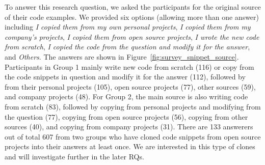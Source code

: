 \documentclass{svjour3}                     %
\begin{document}
To answer this research question, we asked the participants for the original
source of their code examples. We provided six options (allowing more than one
answer) including \textit{I copied them from my own personal projects},
\textit{I copied them from my company's projects}, \textit{I copied them from
	open source projects}, \textit{I wrote the new code from scratch}, \textit{I
	copied the code from the question and modify it for the answer}, and
\textit{Others}. The answers are shown in
Figure~\ref{fig:survey_snippet_source}. Participants in Group 1 mainly write new
code from scratch (116) or copy from the code snippets in question and modify it
for the answer (112), followed by from their personal projects (105), open
source projects (77), other sources (59), and company projects (48). For Group
2, the main source is also writing code from scratch (83), followed by copying
from personal projects and modifying from the question (77), copying from open
source projects (56), copying from other sources (40), and copying from company
projects (31). There are 133 answerers out of total 607 from two groups who have cloned
code snippets from open source projects into their answers at least once. We are interested
in this type of clones and will investigate further in the later RQs.
\end{document}
